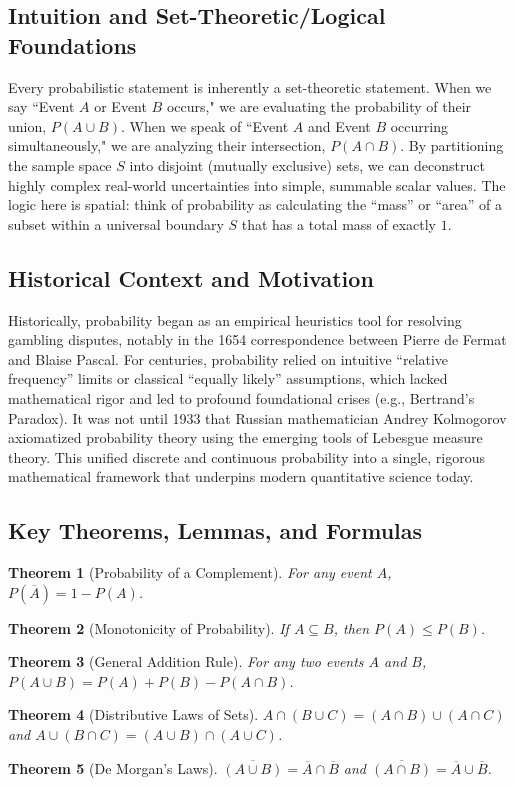 \documentclass[12pt]{article}
\newtheorem{theorem}{Theorem}[section]
\begin{document}
\subsection{Intuition and Set-Theoretic/Logical Foundations}
Every probabilistic statement is inherently a set-theoretic statement. When we say ``Event $A$ or Event $B$ occurs," we are evaluating the probability of their union, $P(A \cup B)$. When we speak of ``Event $A$ and Event $B$ occurring simultaneously," we are analyzing their intersection, $P(A \cap B)$. By partitioning the sample space $S$ into disjoint (mutually exclusive) sets, we can deconstruct highly complex real-world uncertainties into simple, summable scalar values. The logic here is spatial: think of probability as calculating the ``mass'' or ``area'' of a subset within a universal boundary $S$ that has a total mass of exactly $1$.

\subsection{Historical Context and Motivation}
Historically, probability began as an empirical heuristics tool for resolving gambling disputes, notably in the 1654 correspondence between Pierre de Fermat and Blaise Pascal. For centuries, probability relied on intuitive ``relative frequency'' limits or classical ``equally likely'' assumptions, which lacked mathematical rigor and led to profound foundational crises (e.g., Bertrand's Paradox). It was not until 1933 that Russian mathematician Andrey Kolmogorov axiomatized probability theory using the emerging tools of Lebesgue measure theory. This unified discrete and continuous probability into a single, rigorous mathematical framework that underpins modern quantitative science today.

\subsection{Key Theorems, Lemmas, and Formulas}
\begin{theorem}[Probability of a Complement]
For any event $A$, $P(\overline{A}) = 1 - P(A)$.
\end{theorem}
\begin{theorem}[Monotonicity of Probability]
If $A \subseteq B$, then $P(A) \leq P(B)$.
\end{theorem}
\begin{theorem}[General Addition Rule]
For any two events $A$ and $B$, $P(A \cup B) = P(A) + P(B) - P(A \cap B)$.
\end{theorem}
\begin{theorem}[Distributive Laws of Sets]
$A \cap (B \cup C) = (A \cap B) \cup (A \cap C)$ and $A \cup (B \cap C) = (A \cup B) \cap (A \cup C)$.
\end{theorem}
\begin{theorem}[De Morgan's Laws]
$\overline{(A \cup B)} = \overline{A} \cap \overline{B}$ and $\overline{(A \cap B)} = \overline{A} \cup \overline{B}$.
\end{theorem}
\end{document}
